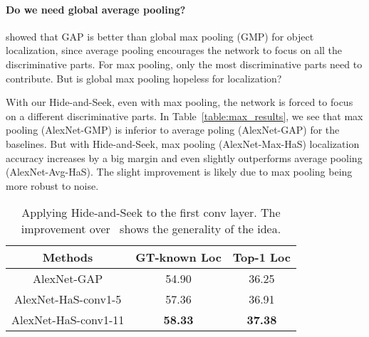 \vspace{-10pt}
\paragraph{Do we need global average pooling?}  \cite{zhou-cvpr2016} showed that GAP is better than global max pooling (GMP) for object localization, since average pooling encourages the network to focus on all the discriminative parts.  For max pooling, only the most discriminative parts need to contribute. But is global max pooling hopeless for localization?


With our Hide-and-Seek, even with max pooling, the network is forced to focus on a different discriminative parts.   In Table~\ref{table:max_results}, we see that max pooling (AlexNet-GMP) is inferior to average poling (AlexNet-GAP) for the baselines. But with Hide-and-Seek, max pooling (AlexNet-Max-HaS) localization accuracy increases by a big margin and even slightly outperforms average pooling (AlexNet-Avg-HaS). The slight improvement is likely due to max pooling being more robust to noise.




\begin{table}[t!]
                \begin{center}
                    \footnotesize
                    \begin{tabular}{| c | c | c|}
                    \hline    	
                    Methods & GT-known Loc &  Top-1 Loc \\
                    \hline

                    AlexNet-GAP            & 54.90 & 36.25 \\
                    AlexNet-HaS-conv1-5            & 57.36 & 36.91  \\
                    AlexNet-HaS-conv1-11            &  \textbf{58.33}  & \textbf{37.38}  \\

                    \hline
                     \end{tabular}
                            \caption{Applying Hide-and-Seek to the first conv layer. The improvement over~\cite{zhou-cvpr2016} shows the generality of the idea.}
                            \label{table:conv_results}
                            \end{center}
                            \vspace*{-0.15in}
                            \end{table}


